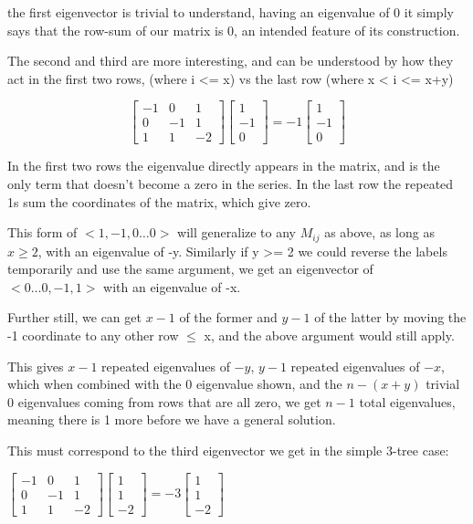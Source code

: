 \documentclass{report}
\begin{document}
the first eigenvector is trivial to understand, having an eigenvalue of 0 it
simply says that the row-sum of our matrix is 0, an intended feature of its
construction.

The second and third are more interesting, and can be understood by how they
act in the first two rows, (where i <= x) vs the last row (where x < i <= x+y)

\begin{equation*}
\left[\begin{matrix}
	-1 & 0 & 1\\
	0 & -1 & 1\\
	1 & 1 & -2
\end{matrix}\right]
\left[\begin{matrix}
	1\\
	-1\\
	0
\end{matrix}\right]
=
-1
\left[\begin{matrix}
	1\\
	-1\\
	0
\end{matrix}\right]
\end{equation*}

In the first two rows the eigenvalue directly appears in the matrix, and is the
only term that doesn't become a zero in the series.
In the last row the repeated 1s sum the coordinates of the matrix, which give
zero.

This form of $<1, -1, 0\ldots 0>$ will generalize to any $M_{ij}$ as above, as
long as $x \geq 2$, with an eigenvalue of -y.
Similarly if y >= 2 we could reverse the labels temporarily and use the same
argument, we get an eigenvector of $<0\ldots 0, -1, 1>$ with an eigenvalue of
-x.

Further still, we can get $x-1$ of the former and $y-1$ of the latter by moving
the -1 coordinate to any other row $\leq$ x, and the above argument would still
apply.

This gives $x-1$ repeated eigenvalues of $-y$, $y-1$ repeated eigenvalues of $-x$,
which when combined with the 0 eigenvalue shown, and the $n - (x + y)$ trivial $0$
eigenvalues coming from rows that are all zero, we get $n-1$ total eigenvalues,
meaning there is 1 more before we have a general solution.

This must correspond to the third eigenvector we get in the simple 3-tree case:

$
\left[\begin{matrix}
	-1 & 0 & 1\\
	0 & -1 & 1\\
	1 & 1 & -2
\end{matrix}\right]
\left[\begin{matrix}
	1\\
	1\\
	-2
\end{matrix}\right]
=
-3
\left[\begin{matrix}
	1\\
	1\\
	-2
\end{matrix}\right]
$
\end{document}
